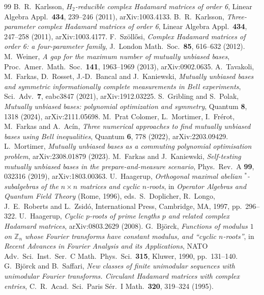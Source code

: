\documentclass[11pt]{article}
\theoremstyle{definition}
\theoremstyle{remark}
\begin{document}
\begin{thebibliography}{99}
 B.~R.~Karlsson, \emph{$H_2$-reducible complex Hadamard matrices of order 6}, Linear Algebra Appl.\ \textbf{434}, 239--246 (2011), arXiv:1003.4133.
 B.~R.~Karlsson, \emph{Three-parameter complex Hadamard matrices of order 6}, Linear Algebra Appl.\ \textbf{434}, 247--258 (2011), arXiv:1003.4177.
 F.~Sz\"oll\H{o}si, \emph{Complex Hadamard matrices of order 6: a four-parameter family}, J.\ London Math.\ Soc.\ \textbf{85}, 616--632 (2012).
 M.~Weiner, \emph{A gap for the maximum number of mutually unbiased bases}, Proc.\ Amer.\ Math.\ Soc.\ \textbf{141}, 1963--1969 (2013), arXiv:0902.0635.
 A.~Tavakoli, M.~Farkas, D.~Rosset, J.-D.~Bancal and J.~Kaniewski, \emph{Mutually unbiased bases and symmetric informationally complete measurements in Bell experiments}, Sci.\ Adv.\ \textbf{7}, eabc3847 (2021), arXiv:1912.03225.
 S.~Gribling and S.~Polak, \emph{Mutually unbiased bases: polynomial optimization and symmetry}, Quantum \textbf{8}, 1318 (2024), arXiv:2111.05698.
 M.~Prat Colomer, L.~Mortimer, I.~Fr\'erot, M.~Farkas and A.~Ac\'in, \emph{Three numerical approaches to find mutually unbiased bases using Bell inequalities}, Quantum \textbf{6}, 778 (2022), arXiv:2203.09429.
 L.~Mortimer, \emph{Mutually unbiased bases as a commuting polynomial optimisation problem}, arXiv:2308.01879 (2023).
 M.~Farkas and J.~Kaniewski, \emph{Self-testing mutually unbiased bases in the prepare-and-measure scenario}, Phys.\ Rev.\ A \textbf{99}, 032316 (2019), arXiv:1803.00363.
 U.~Haagerup, \emph{Orthogonal maximal abelian $^*$-subalgebras of the $n\times n$ matrices and cyclic $n$-roots}, in \emph{Operator Algebras and Quantum Field Theory} (Rome, 1996), eds.\ S.~Doplicher, R.~Longo, J.~E.~Roberts and L.~Zsid\'o, International Press, Cambridge, MA, 1997, pp.~296--322.
 U.~Haagerup, \emph{Cyclic $p$-roots of prime lengths $p$ and related complex Hadamard matrices}, arXiv:0803.2629 (2008).
 G.~Bj\"orck, \emph{Functions of modulus $1$ on $\mathbb{Z}_n$ whose Fourier transforms have constant modulus, and ``cyclic $n$-roots''}, in \emph{Recent Advances in Fourier Analysis and its Applications}, NATO Adv.\ Sci.\ Inst.\ Ser.\ C Math.\ Phys.\ Sci.\ \textbf{315}, Kluwer, 1990, pp.~131--140.
 G.~Bj\"orck and B.~Saffari, \emph{New classes of finite unimodular sequences with unimodular Fourier transforms. Circulant Hadamard matrices with complex entries}, C.\ R.\ Acad.\ Sci.\ Paris S\'er.\ I Math.\ \textbf{320}, 319--324 (1995).

\end{thebibliography}
\end{document}

